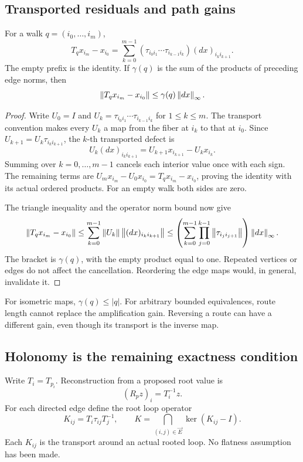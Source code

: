 \subsection{Transported residuals and path gains}
\begin{proposition}\label{KS40}
For a walk \(q=(i_0,\ldots,i_m)\),
\[
 T_qx_{i_m}-x_{i_0}
 =\sum_{k=0}^{m-1}
 (\tau_{i_0i_1}\cdots\tau_{i_{k-1}i_k})(dx)_{i_ki_{k+1}}.
\]
The empty prefix is the identity. If \(\gamma(q)\) is the sum of the products of preceding edge norms, then
\[
 \left\lVert T_qx_{i_m}-x_{i_0}\right\rVert\le\gamma(q)\left\lVert dx\right\rVert_\infty.
\]
\end{proposition}
\begin{proof}
Write \(U_0=I\) and \(U_k=\tau_{i_0i_1}\cdots\tau_{i_{k-1}i_k}\) for \(1\le k\le m\). The transport convention makes every \(U_k\) a map from the fiber at \(i_k\) to that at \(i_0\). Since \(U_{k+1}=U_k\tau_{i_ki_{k+1}}\), the \(k\)-th transported defect is
\[
 U_k(dx)_{i_ki_{k+1}}
 =U_{k+1}x_{i_{k+1}}-U_kx_{i_k}.
\]
Summing over \(k=0,\ldots,m-1\) cancels each interior value once with each sign. The remaining terms are \(U_mx_{i_m}-U_0x_{i_0}=T_qx_{i_m}-x_{i_0}\), proving the identity with its actual ordered products. For an empty walk both sides are zero.

The triangle inequality and the operator norm bound now give
\[
 \left\lVert T_qx_{i_m}-x_{i_0}\right\rVert
 \le\sum_{k=0}^{m-1}\left\lVert U_k\right\rVert\left\lVert(dx)_{i_ki_{k+1}}\right\rVert
 \le\left(\sum_{k=0}^{m-1}\prod_{j=0}^{k-1}\left\lVert\tau_{i_ji_{j+1}}\right\rVert\right)\left\lVert dx\right\rVert_\infty.
\]
The bracket is \(\gamma(q)\), with the empty product equal to one. Repeated vertices or edges do not affect the cancellation. Reordering the edge maps would, in general, invalidate it.
\end{proof}
For isometric maps, \(\gamma(q)\le|q|\). For arbitrary bounded equivalences, route length cannot replace the amplification gain. Reversing a route can have a different gain, even though its transport is the inverse map.

\subsection{Holonomy is the remaining exactness condition}
Write \(T_i=T_{p_i}\). Reconstruction from a proposed root value is
\[
 (R_pz)_i=T_i^{-1}z.
\]
For each directed edge define the root loop operator
\[
 K_{ij}=T_i\tau_{ij}T_j^{-1},\qquad
 K=\bigcap_{(i,j)\in\vec E}\ker(K_{ij}-I).
\]
Each \(K_{ij}\) is the transport around an actual rooted loop. No flatness assumption has been made.

